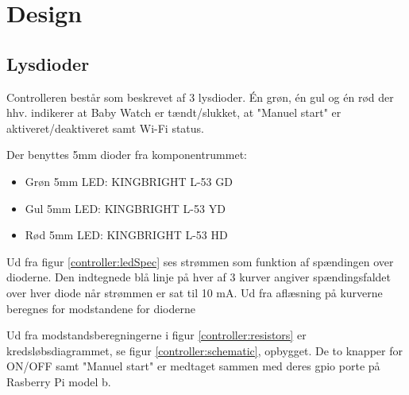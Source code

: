 \section{Design}

\subsection{Lysdioder}

Controlleren består som beskrevet af 3 lysdioder. Én grøn, én gul og én rød der hhv. indikerer at Baby Watch er tændt/slukket, at "Manuel start" er aktiveret/deaktiveret samt Wi-Fi status. 

Der benyttes 5mm dioder fra komponentrummet: 

\begin{itemize}
	\item Grøn 5mm LED: KINGBRIGHT L-53 GD
	\item Gul 5mm LED: KINGBRIGHT L-53 YD
	\item Rød 5mm LED: KINGBRIGHT L-53 HD
\end{itemize}



Ud fra figur \ref{controller:ledSpec} ses strømmen som funktion af spændingen over dioderne. Den indtegnede blå linje på hver af 3 kurver angiver spændingsfaldet over hver diode når strømmen er sat til 10 mA. Ud fra aflæsning på kurverne beregnes for modstandene for dioderne


Ud fra modstandsberegningerne i figur \ref{controller:resistors} er kredsløbsdiagrammet, se figur \ref{controller:schematic}, opbygget. De to knapper for ON/OFF samt "Manuel start" er medtaget sammen med deres gpio porte på Rasberry Pi model b.

